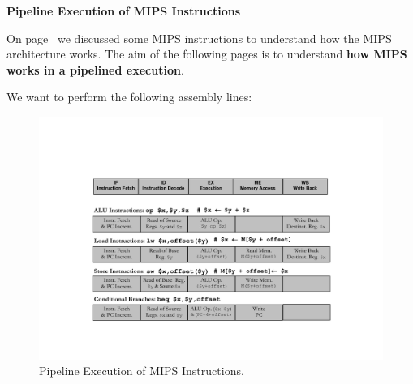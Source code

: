 \documentclass[a4paper]{article}
\newcommand{\highspace}{\vspace{1.2em}\noindent}
\begin{document}
    \newpage

    \begin{center}
        \large
        \textcolor{Red3}{\textbf{Pipeline Execution of MIPS Instructions}}
    \end{center}
    On page~\pageref{Execution (EX) details} we discussed some MIPS instructions to understand how the MIPS architecture works. The aim of the following pages is to understand \textbf{how MIPS works in a pipelined execution}.

    \highspace
    We want to perform the following assembly lines:
    
    \begin{figure}[!htp]
        \centering
        \includegraphics[width=\textwidth]{img/sequential-vs-pipelining-2.pdf}
        \caption{Pipeline Execution of MIPS Instructions.\cite{pipelining-slides}}
    \end{figure}

    \newpage
\end{document}
